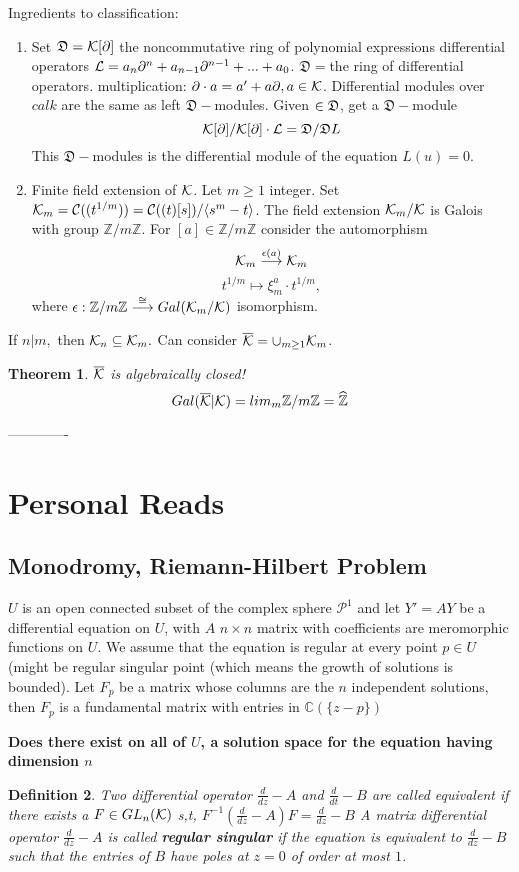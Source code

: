 \documentclass[11pt]{article}
\newtheorem{thm}{Theorem}[section]
\newtheorem{dfn}[thm]{Definition}
\newcommand{\pd}{\partial}
\newcommand{\cplx}{\mathbb C}
\newcommand{\intg}{\mathbb Z}
\newcommand{\calc}{{\cal C}}
\newcommand{\calk}{{\cal K}}
\newcommand{\call}{{\cal L}}
\newcommand{\lrta}{\longrightarrow}
\newcommand{\lgl}{\langle}
\newcommand{\rgl}{\rangle}
\begin{document}
Ingredients to classification:
\begin{enumerate}
\item 
Set $\mathfrak{D}=\calk[\pd]$ the noncommutative ring of polynomial expressions differential operators
$\call=a_n\pd^n+a_{n-1}\pd^{n-1}+...+a_0$. $\mathfrak{D}=$the ring of differential operators. multiplication: $\pd\cdot a =a'+a\pd,a\in\calk$. Differential modules over $calk$ are the same as left $\mathfrak{D}-$modules. Given $\cal\in\mathfrak{D}$, get a $\mathfrak{D}-$module
$$
\calk[\pd]/\calk[\pd]\cdot \call=\mathfrak{D}/\mathfrak{D}L
$$
This $\mathfrak{D}-$modules is the differential module of the equation $L(u)=0$.
\item Finite field extension of $\calk$. Let $m\geq 1$ integer. Set $\calk_m=\calc((t^{1/m}))=\calc((t)[s])/\lgl s^m-t\rgl$. The field extension $\calk_m/\calk$ is Galois with group $\intg/m\intg$. For $[a]\in\intg/m\intg$ consider the automorphism
 $$
 \calk_m\overset{\epsilon(a)}{\lrta}\calk_m
 $$
 $$
 t^{1/m}\longmapsto \xi^a_m\cdot t^{1/m},
 $$
 where $\epsilon:\intg/m\intg\overset{\cong}{\lrta}Gal(\calk_m/\calk)$ isomorphism. 
\end{enumerate}
If $n|m,$ then $\calk_n\subseteq \calk_m.$ Can consider $\overline{\calk}=\cup_{m\geq 1}\calk_m$.
\begin{thm}
$\overline{\calk}$ is algebraically closed!
$$
Gal(\overline{\calk}|\calk)=lim_m \intg/m\intg=\widehat{\intg}
$$
\end{thm}





-------------
\section{Personal Reads}
\subsection{Monodromy, Riemann-Hilbert Problem}
$U$ is an open connected subset of the complex sphere $\mathcal{P}^1$ and let $Y'=AY$ be a differential equation on $U$, with $ A$ $n\times n$ matrix with coefficients are meromorphic functions on $U$. We assume that the equation is regular at every point $p\in U$ (might be regular singular point (which means the growth of solutions is bounded). Let $F_p$ be a matrix whose columns are the $n$ independent solutions, then $F_p$ is a fundamental matrix with entries in $\cplx(\{z-p\})$

\textbf{Does there exist on all of $U$, a solution space for the equation having dimension $n$}

\begin{dfn}
Two differential operator $\frac{d}{dz}-A$ and $\frac{d}{dt}-B$ are called equivalent if there exists a $F\in GL_n(\calk)$ s,t, $F^{-1}(\frac{d}{dz}-A)F=\frac{d}{dz}-B$
A matrix differential operator $\frac{d}{dz}-A$ is called \textbf{regular singular} if the equation is equivalent to $\frac{d}{dz}-B$ such that the entries of $B$ have poles at $z=0$ of order at most $1$.
\end{dfn}
\end{document}
